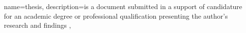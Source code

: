 
{
  name=thesis,
  description={is a document submitted in a support of candidature for an
    academic degree or professional qualification presenting the author's
    research and findings
  },
}
